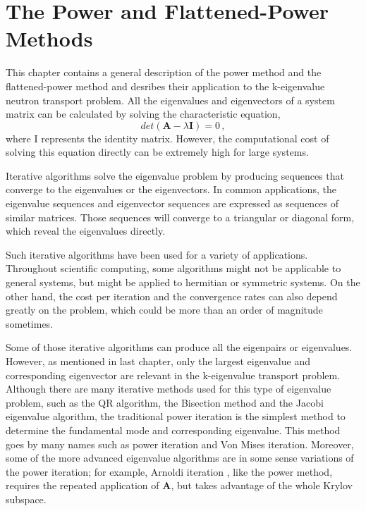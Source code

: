 \cleardoublepage

\chapter{The Power and Flattened-Power Methods}
\label{chapter:PM}

This chapter contains a general description of the power method and the flattened-power method and desribes their application to the k-eigenvalue neutron transport problem.
All the eigenvalues and eigenvectors of a system matrix can be calculated by solving the characteristic equation,
\begin{equation}
det(\mathbf{A} -\lambda \mathbf{I} ) = 0 \, ,
\label{eq:characteristic}
\end{equation}
where I represents the identity matrix.
However, the computational cost of solving this equation directly can be extremely high for large systems. 

Iterative algorithms solve the eigenvalue problem by producing sequences that converge to the eigenvalues or the eigenvectors.
In common applications, the eigenvalue sequences and eigenvector sequences are expressed as sequences of similar matrices. 
Those sequences will converge to a triangular or diagonal form, which reveal the eigenvalues directly. 

Such iterative algorithms have been used for a variety of applications.
Throughout scientific computing, some algorithms might not be applicable to general systems, but might be applied to hermitian or symmetric systems.
On the other hand, the cost per iteration and the convergence rates can also depend greatly on the problem, which could be more than an order of magnitude sometimes. 

Some of those iterative algorithms can produce all the eigenpairs or eigenvalues. 
However, as mentioned in last chapter, only the largest eigenvalue and corresponding eigenvector are relevant in the k-eigenvalue transport problem.
Although there are many iterative methods used for this type of eigenvalue problem, such as the QR algorithm, the Bisection method and the Jacobi eigenvalue algorithm, the traditional power iteration is the simplest method to determine the fundamental mode and corresponding eigenvalue.
This method goes by many names such as power iteration and Von Mises iteration\cite{mises1929praktische}.
Moreover, some of the more advanced eigenvalue algorithms are in some sense variations of the power iteration; for example, Arnoldi iteration \cite{arnoldi1951principle}, like the power method, requires the repeated application of $\mathbf{A}$, but takes advantage of the whole Krylov subspace. 

